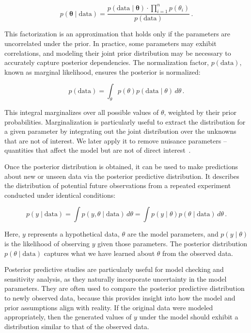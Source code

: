 \begin{equation}
\label{eq:bayes_theorem_indep}
	p(\boldsymbol{\theta} \mid \mathrm{data}) = \frac{p(\mathrm{data} \mid \boldsymbol{\theta}) \cdot \prod_{i=1}^n p(\theta_i)} {p(\mathrm{data})} \,.
\end{equation}

This factorization is an approximation that holds only if the parameters are uncorrelated under the prior. In practice, some parameters may exhibit correlations, and modeling their joint prior distribution may be necessary to accurately capture posterior dependencies.
The normalization factor, $p(\mathrm{data})$, known as marginal likelihood, ensures the posterior is normalized:

\begin{equation}
\label{eq:bayes_theorem_normalization}
	p(\mathrm{data}) = \int_{\theta} p(\theta) p(\mathrm{data} \mid \theta) \, d\theta \,.
\end{equation}

This integral marginalizes over all possible values of $\theta$, weighted by their prior probabilities. Marginalization is particularly useful to extract the distribution for a given parameter by integrating out the joint distribution over the unknowns that are not of interest. We later apply it to remove nuisance parameters -- quantities that affect the model but are not of direct interest~\cite{gelman_bayesian_2014}. 

Once the posterior distribution is obtained, it can be used to make predictions about new or unseen data via the posterior predictive distribution. It describes the distribution of potential future observations from a repeated experiment conducted under identical conditions:

\begin{equation}
	p(y \mid \mathrm{data}) = \int p(y, \theta \mid \mathrm{data}) \, d\theta = \int p(y \mid \theta) p(\theta \mid \mathrm{data}) \, d\theta \,.
\end{equation}

\noindent Here, $y$ represents a hypothetical data, $\theta$ are the model parameters, and $p(y \mid \theta)$ is the likelihood of observing $y$ given those parameters. The posterior distribution $p(\theta \mid \mathrm{data})$ captures what we have learned about $\theta$ from the observed data.  

Posterior predictive studies are particularly useful for model checking and sensitivity analysis, as they naturally incorporate uncertainty in the model parameters. They are often used to compare the posterior predictive distribution to newly observed data, because this provides insight into how the model and prior assumptions align with reality. If the original data were modeled appropriately, then the generated values of $y$ under the model should exhibit a distribution similar to that of the observed data.


